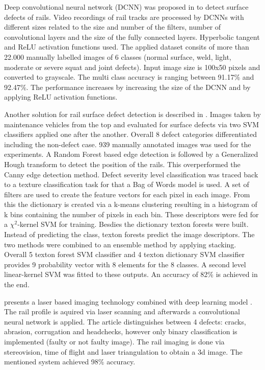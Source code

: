 \documentclass[10pt, final]{article}
\begin{document}
		Deep convolutional neural network (DCNN) was proposed in \cite{faghih-roohi_deep_2016} to detect surface defects of rails.
		Video recordings of rail tracks are processed by DCNNs with different sizes related to the size and number
		of the filters, number of convolutional layers and the size of the fully connected layers.
		Hyperbolic tangent and ReLU activation functions used.
		The applied dataset consits of more than 22.000 manually labelled images of 6 classes 
		(normal surface, weld, light, moderate or severe squat and joint defects).
		Input image size is 100x50 pixels and converted to grayscale.
		The multi class accuracy is ranging between 91.17\% and 92.47\%.
		The performance increases by increasing the size of the DCNN and by applying ReLU activation functions.

		Another solution for rail surface defect detection is described in \cite{ma_texture_2016}.
		Images taken by maintenance vehicles from the top and evaluated for surface defects via two SVM classifiers
		applied one after the another.
		Overall 8 defect categories differentiated including the non-defect case.
		939 manually annotated images was used for the experiments.
		A Random Forest based edge detection is followed by a Generalized Hough transform to detect the position of the rails.
		This overperformed the Canny edge detection method.
		Defect severity level classification was traced back to a texture classification task for that a Bag of Words model
		is used.
		A set of filters are used to create the feature vectors for each pixel in each image.
		From this the dictionary is created via a k-means clustering resulting in a histogram of k bins containing the number
		of pixels in each bin.
		These descriptors were fed for a $\chi^2$-kernel SVM for training.
		Besdies the dictionary texton forests were built.
		Instead of predicting the class, texton forests predict the image descriptors.
		The two methods were combined to an ensemble method by applying stacking.
		Overall 5 texton forest SVM classifier and 4 texton dictionary SVM classifier provides 9 probability vector with
		8 elements for the 8 classes.
		A second level linear-kernel SVM was fitted to these outputs.
		An accuracy of 82\% is achieved in the end.

		\citeauthor{santur_new_2017} presents a laser based imaging technology combined with deep learning model \cite{santur_new_2017}.
		The rail profile is aquired via laser scanning and afterwards a convolutional neural network is applied.
		The article distinguishes between 4 defects: cracks, abrasion, corrugation and headchecks, however only binary classification
		is implemented (faulty or not faulty image).
		The rail imaging is done via stereovision, time of flight and laser triangulation to obtain a 3d image.
		The mentioned system achieved 98\% accuracy.
\end{document}
